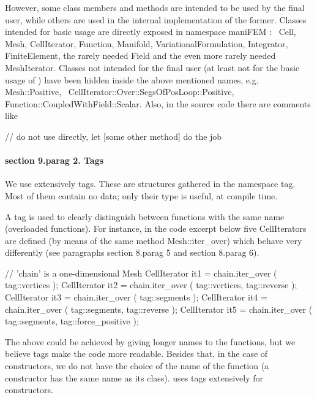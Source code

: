 {However, some class members and methods are intended to be used by the final user,
while others are used in the internal implementation of the former.
Classes \hbox{intended} for basic usage are directly exposed in {\codett namespace maniFEM} :
\ {\codett Cell}, {\codett Mesh}, {\codett CellIterator}, \hbox{\codett Function},
{\codett Manifold}, {\codett VariationalFormulation}, {\codett Integrator},
{\codett FiniteElement}, the rarely needed {\codett Field} and the even more rarely needed
{\codett MeshIterator}.
Classes not intended for the final user (at least not for the basic usage of \maniFEM)
have been hidden inside the above mentioned names, e.g. {\codett Mesh::Positive},
\ {\codett CellIterator::Over::SegsOfPosLoop::Positive},
\hbox{\codett Function::CoupledWithField::Scalar}.
Also, in the source code there are comments like

\verbatim
   // do not use directly, let [some other method] do the job
\endverbatim


\paragraph{\numb section 9.\numb parag 2. Tags}

We use extensively {\codett tag}s.
These are structures gathered in the {\codett namespace tag}.
Most of them contain no data; only their type is useful, at compile time.

A {\codett tag} is used to clearly distinguish between functions with the same name
(overloaded functions).
For instance, in the code excerpt below five {\codett CellIterator}s are defined
(by means of the same method {\codett Mesh::iter\_over}) which
behave very differently (see paragraphs \numb section 8.\numb parag 5 and
\numb section 8.\numb parag 6).

\verbatim
   // 'chain' is a one-dimensional Mesh
   CellIterator it1 = chain.iter_over ( tag::vertices );
   CellIterator it2 = chain.iter_over ( tag::vertices, tag::reverse );
   CellIterator it3 = chain.iter_over ( tag::segments );
   CellIterator it4 = chain.iter_over ( tag::segments, tag::reverse );
   CellIterator it5 = chain.iter_over ( tag::segments, tag::force_positive );
\endverbatim

The above could be achieved by giving longer names to the functions, but we believe
{\codett tag}s make the code more readable.
Besides that, in the case of constructors, we do not have the choice of the name of the function
(a constructor has the same name as its class).
{\ManiFEM} uses {\codett tag}s extensively for constructors.

}
